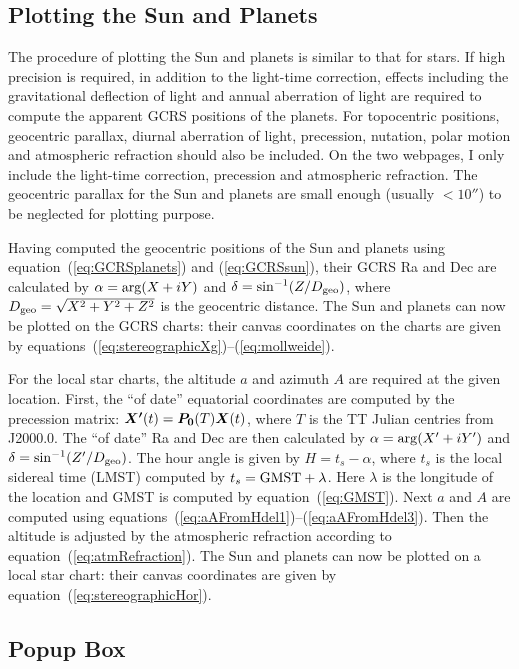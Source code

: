 \documentclass[12pt]{article}
\newcommand{\ve}[1]{\mbox{\boldmath $#1$}}
\begin{document}
\subsection{Plotting the Sun and Planets}

The procedure of plotting the Sun and planets is similar to that for 
stars. If high precision is required, in addition to the light-time correction,
effects including the gravitational deflection of light 
and annual aberration of light are required to compute the apparent GCRS 
positions of the planets. For topocentric positions, geocentric parallax, 
diurnal aberration of light, precession, nutation, polar motion and 
atmospheric refraction should also be included. On the two webpages, I only include 
the light-time correction, precession and atmospheric refraction. The geocentric 
parallax for the Sun and planets are small enough (usually $< 10''$) to be 
neglected for plotting purpose.

Having computed the geocentric positions of the Sun and planets using 
equation~(\ref{eq:GCRSplanets}) and (\ref{eq:GCRSsun}), their GCRS Ra and 
Dec are calculated by $\alpha={\rm arg}(X+iY)$ and $\delta=\sin^{-1}(Z/D_{\rm geo})$, 
where $D_{\rm geo}=\sqrt{X^2+Y^2+Z^2}$ is the geocentric distance. The Sun 
and planets can now be plotted on the GCRS charts: their canvas coordinates on the
charts are given by equations~(\ref{eq:stereographicXg})--(\ref{eq:mollweide}). 

For the local star charts, the altitude $a$
and azimuth $A$ are required at the given location. First, the ``of date'' equatorial
coordinates are computed by the precession matrix: $\ve{X'}(t)=\ve{P_0}(T)\ve{X}(t)$,
where $T$ is the TT Julian centries from J2000.0. The ``of date'' Ra and Dec
are then calculated by $\alpha = {\rm arg}(X'+iY')$ and $\delta=\sin^{-1} (Z'/D_{\rm geo})$.
The hour angle is given by $H=t_s-\alpha$, where $t_s$ is the local
sidereal time (LMST) computed by $t_s = {\rm GMST}+\lambda$.
Here $\lambda$ is the longitude of the location and GMST is computed
by equation~(\ref{eq:GMST}). Next $a$ and $A$ are computed using
equations~(\ref{eq:aAFromHdel1})--(\ref{eq:aAFromHdel3}). Then the altitude
is adjusted by the atmospheric refraction according to equation~(\ref{eq:atmRefraction}).
The Sun and planets can now be plotted on a local star chart: their canvas coordinates are
given by equation~(\ref{eq:stereographicHor}).

\subsection{Popup Box} 
\end{document}

